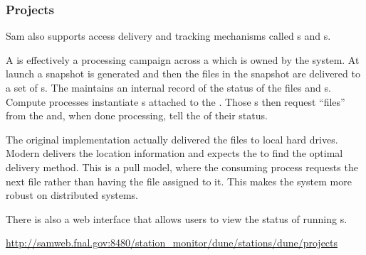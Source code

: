 
\subsubsection{Projects}


Sam also supports access delivery and  tracking mechanisms called s and s.

A  is effectively a processing campaign across a  which is owned by the  system. At launch a snapshot is generated and then the files in the snapshot are delivered to a set of s.  The  maintains an internal record of the status of the files and s. Compute processes instantiate s attached to the .  Those s then request “files” from the  and, when done processing, tell the  of their status.  

The original  implementation actually delivered the files to local hard drives.  Modern  delivers the location information and expects the  to find the optimal delivery method. This is a pull model, where the consuming process requests the next file rather than having the file assigned to it.  This makes the system more robust on distributed systems. 

There is also a web interface that allows users to view the status of running s. 

\href{http://samweb.fnal.gov:8480/station_monitor/dune/stations/dune/projects}{http://samweb.fnal.gov:8480/station\_monitor/dune/stations/dune/projects}






